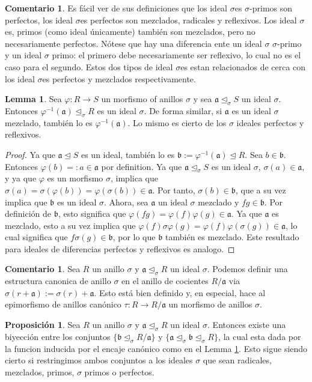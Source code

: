 \documentclass[12pt,a4paper,BCOR15mm,twoside,DIV12]{article}
\def\a{\mathfrak{a}}
\def\b{\mathfrak{b}}
\def\s{\sigma}
\def\si{\unlhd_{\sigma}}
\newenvironment{bew}{\begin{proof}[Proof]}{\end{proof}}
\theoremstyle{definition}
\newtheorem{prop}[Satz]{Proposici\'{o}n}
\newtheorem{rem}[Satz]{Comentario}
\newtheorem{lem}[Satz]{Lemma}
\begin{document}
\begin{rem}
Es fácil ver de sus definiciones que los ideal $\s$es $\s$-primos son perfectos, los ideal $\s$es perfectos son mezclados, radicales y reflexivos. Los ideal $\s$es, primos (como ideal únicamente) también son mezclados, pero no necesariamente perfectos.
Nótese que hay una diferencia ente un ideal $\s$ $\s$-primo y un ideal $\s$ primo: el primero debe necesariamente ser reflexivo, lo cual no es el caso para el segundo. 
Estos dos tipos de ideal $\s$es estan relacionados de cerca con los ideal $\s$es perfectos y mezclados respectivamente.
\end{rem}

\begin{lem}\label{bijmapping}
Sea $\varphi: R \rightarrow S$ un morfismo of anillos $\s$ y sea $\a \si S$ un ideal $\s$. Entonces $\varphi^{-1}(\a) \si R$ es un ideal $\s$. 
De forma similar, si $\a$ es un ideal $\s$ mezclado, también lo es $\varphi^{-1}(\a)$. Lo mismo es cierto de los $\s$ ideales perfectos y reflexivos.
\begin{bew}
Ya que $\a \unlhd S$ es un ideal, también lo es $\b := \varphi^{-1}(\a) \unlhd R$. Sea $b \in \b$. Entonces $\varphi(b) =: a \in \a$ por definition. Ya que $\a \si S$ es un ideal $\s$, $\s(a) \in \a$, y ya que $\varphi$ es un morfismo $\s$,
 implica que $\sigma(a) = \sigma(\varphi(b)) = \varphi (\s (b)) \in \a$. Por tanto, $\s(b) \in \b$, que a su vez implica que $\b$ es un ideal $\s$. Ahora, sea $\a$ un ideal $\s$ mezclado y $fg \in \b$. Por definición de $\b$, 
esto significa que $\varphi(fg) = \varphi(f) \varphi(g) \in \a$. Ya que $\a$ es mezclado, esto a su vez implica que $\varphi(f) \s \varphi(g) = \varphi(f) \varphi(\s(g)) \in \a$, lo cual significa que $f\s(g) \in \b$, por lo que $\b$ también es mezclado.
Este resultado para ideales de diferencias perfectos y reflexivos es analogo.
\end{bew}
\end{lem}

\begin{rem}
Sea $R$ un anillo $\s$ y $\a \si R$ un ideal $\s$. Podemos definir una estructura canonica de anillo $\s$ en el anillo de cocientes $R/\a$ via $\s(r+\a):= \s(r) + \a$. 
Esto está bien definido y, en especial, hace al epimorfismo de anillos canónico $\tau: R \rightarrow R/\a$ un morfismo de anillos $\s$.
\end{rem}

\begin{prop}\label{bijideals}
Sea $R$ un anillo $\s$ y $\a \si R$ un ideal $\s$. Entonces existe una biyección entre los conjuntos $\{ \b \si R/\a \}$ y $\{ \a \si \b \si R \}$, la cual esta dada por la funcion inducida por el encaje canónico como en el Lemma \ref{bijmapping}. 
Esto sigue siendo cierto si restringimos ambos conjuntos a los ideales $\s$ que sean radicales, mezclados, primos, $\s$ primos o perfectos.
\end{prop}
\end{document}
